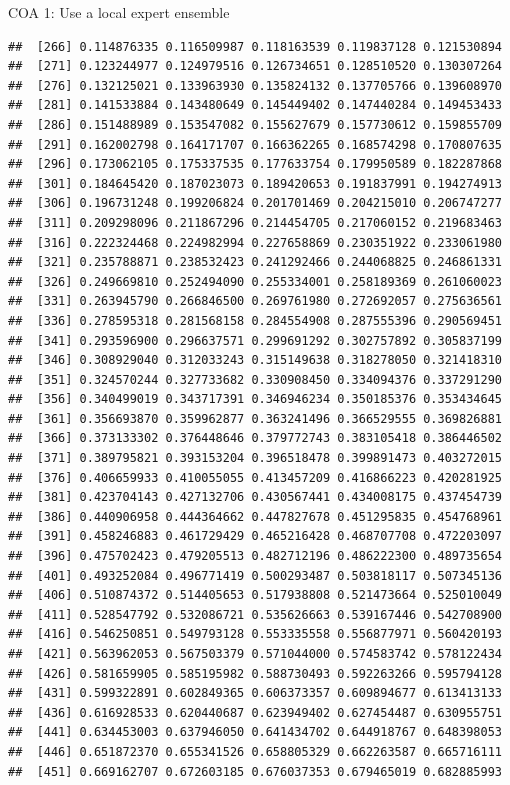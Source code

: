 \documentclass[ignorenonframetext,]{beamer}
\begin{document}
\begin{frame}[fragile]{COA 1: Use a local expert ensemble}
\begin{verbatim}
##  [266] 0.114876335 0.116509987 0.118163539 0.119837128 0.121530894
##  [271] 0.123244977 0.124979516 0.126734651 0.128510520 0.130307264
##  [276] 0.132125021 0.133963930 0.135824132 0.137705766 0.139608970
##  [281] 0.141533884 0.143480649 0.145449402 0.147440284 0.149453433
##  [286] 0.151488989 0.153547082 0.155627679 0.157730612 0.159855709
##  [291] 0.162002798 0.164171707 0.166362265 0.168574298 0.170807635
##  [296] 0.173062105 0.175337535 0.177633754 0.179950589 0.182287868
##  [301] 0.184645420 0.187023073 0.189420653 0.191837991 0.194274913
##  [306] 0.196731248 0.199206824 0.201701469 0.204215010 0.206747277
##  [311] 0.209298096 0.211867296 0.214454705 0.217060152 0.219683463
##  [316] 0.222324468 0.224982994 0.227658869 0.230351922 0.233061980
##  [321] 0.235788871 0.238532423 0.241292466 0.244068825 0.246861331
##  [326] 0.249669810 0.252494090 0.255334001 0.258189369 0.261060023
##  [331] 0.263945790 0.266846500 0.269761980 0.272692057 0.275636561
##  [336] 0.278595318 0.281568158 0.284554908 0.287555396 0.290569451
##  [341] 0.293596900 0.296637571 0.299691292 0.302757892 0.305837199
##  [346] 0.308929040 0.312033243 0.315149638 0.318278050 0.321418310
##  [351] 0.324570244 0.327733682 0.330908450 0.334094376 0.337291290
##  [356] 0.340499019 0.343717391 0.346946234 0.350185376 0.353434645
##  [361] 0.356693870 0.359962877 0.363241496 0.366529555 0.369826881
##  [366] 0.373133302 0.376448646 0.379772743 0.383105418 0.386446502
##  [371] 0.389795821 0.393153204 0.396518478 0.399891473 0.403272015
##  [376] 0.406659933 0.410055055 0.413457209 0.416866223 0.420281925
##  [381] 0.423704143 0.427132706 0.430567441 0.434008175 0.437454739
##  [386] 0.440906958 0.444364662 0.447827678 0.451295835 0.454768961
##  [391] 0.458246883 0.461729429 0.465216428 0.468707708 0.472203097
##  [396] 0.475702423 0.479205513 0.482712196 0.486222300 0.489735654
##  [401] 0.493252084 0.496771419 0.500293487 0.503818117 0.507345136
##  [406] 0.510874372 0.514405653 0.517938808 0.521473664 0.525010049
##  [411] 0.528547792 0.532086721 0.535626663 0.539167446 0.542708900
##  [416] 0.546250851 0.549793128 0.553335558 0.556877971 0.560420193
##  [421] 0.563962053 0.567503379 0.571044000 0.574583742 0.578122434
##  [426] 0.581659905 0.585195982 0.588730493 0.592263266 0.595794128
##  [431] 0.599322891 0.602849365 0.606373357 0.609894677 0.613413133
##  [436] 0.616928533 0.620440687 0.623949402 0.627454487 0.630955751
##  [441] 0.634453003 0.637946050 0.641434702 0.644918767 0.648398053
##  [446] 0.651872370 0.655341526 0.658805329 0.662263587 0.665716111
##  [451] 0.669162707 0.672603185 0.676037353 0.679465019 0.682885993

\end{verbatim}
\end{frame}
\end{document}
